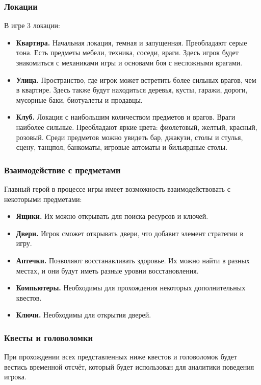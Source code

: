 \documentclass[12pt]{article}
\begin{document}
\subsubsection{Локации}
В игре 3 локации:

\begin{itemize}
    \item \textbf{Квартира.} Начальная локация, темная и запущенная. Преобладают серые тона. Есть предметы мебели, техника, соседи, враги. Здесь игрок будет знакомиться с механиками игры и основами боя с несложными врагами.
    \item \textbf{Улица.} Пространство, где игрок может встретить более сильных врагов, чем в квартире. Здесь также будут находиться деревья, кусты, гаражи, дороги, мусорные баки, биотуалеты и продавцы.
    \item \textbf{Клуб.} Локация с наибольшим количеством предметов и врагов. Враги наиболее сильные. Преобладают яркие цвета: фиолетовый, желтый, красный, розовый. Среди предметов можно увидеть бар, джакузи, столы и стулья, сцену, танцпол, банкоматы, игровые автоматы и бильярдные столы.
\end{itemize}

\subsubsection{Взаимодействие с предметами}
Главный герой в процессе игры имеет возможность взаимодействовать с некоторыми предметами:

\begin{itemize}
    \item \textbf{Ящики.} Их можно открывать для поиска ресурсов и ключей.
    \item \textbf{Двери.} Игрок сможет открывать двери, что добавит элемент стратегии в игру.
    \item \textbf{Аптечки.} Позволяют восстанавливать здоровье. Их можно найти в разных местах, и они будут иметь разные уровни восстановления.
    \item \textbf{Компьютеры.} Необходимы для прохождения некоторых дополнительных квестов.
    \item \textbf{Ключи.} Необходимы для открытия дверей.
\end{itemize}

\subsubsection{Квесты и головоломки}
При прохождении всех представленных ниже квестов и головоломок будет вестись временной отсчёт, который будет использован для аналитики поведения игрока.
\end{document}
